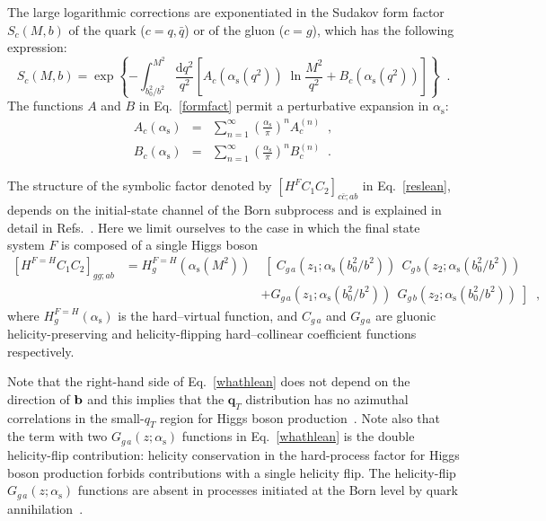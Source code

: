 \documentclass[12pt]{article}
\def\beeq{\begin{eqnarray}}
\def\eeeq{\end{eqnarray}}
\def\nn{\nonumber}
\DeclareRobustCommand{\as}{\ensuremath{\alpha_{\mathrm{s}}}}
\DeclareRobustCommand{\qt}{q_T}
\DeclareRobustCommand{\bqt}{\ensuremath{\mathbf{q}_T}}
\DeclareRobustCommand{\rd}{\ensuremath{\mathrm{d}}}
\begin{document}
The large logarithmic corrections are exponentiated in the Sudakov form factor $S_c(M,b)$ of the quark  ($c=q, {\bar q}$) or of the gluon ($c=g$), which has the following  expression:
\begin{equation}
\label{formfact}
S_c(M,b) = \exp \left\{ - \int_{b_0^2/b^2}^{M^2} \frac{\rd q^2}{q^2} 
\left[ A_c(\as(q^2)) \;\ln \frac{M^2}{q^2} + B_c(\as(q^2)) \right] \right\} 
\;\;. 
\end{equation}
The functions $A$ and $B$  in Eq.~\eqref{formfact} permit a perturbative expansion in $\as$:
\beeq
\label{aexp}
A_c(\as) &=& \sum_{n=1}^\infty \left( \frac{\as}{\pi} \right)^n A_c^{(n)} 
\;\;, \\
\label{bexp}
B_c(\as) &= &\sum_{n=1}^\infty \left( \frac{\as}{\pi} \right)^n B_c^{(n)}
\;\;.
\eeeq

The structure of the symbolic factor denoted by $\left[ H^{F} C_1 C_2 \right]_{c\bar{c};a b}$ in Eq.~\eqref{reslean}, depends on the initial-state channel of the Born subprocess and is explained in detail in Refs.~\cite{Catani:2010pd,Catani:2013tia}. Here we limit ourselves to the case in which the final state system $F$ is composed of a single Higgs boson
\beeq
\label{whathlean}
\left[ H^{F=H} C_1 C_2 \right]_{gg;ab}
&= H_{g}^{F=H}(\as(M^2)) &\;\left[ \; C_{g \,a}(z_1;\as(b_0^2/b^2)) 
\;\, C_{g \,b}(z_2;\as(b_0^2/b^2)) \right.
\nn \\
&&+ \left.  G_{g \,a}(z_1;\as(b_0^2/b^2)) 
\;\, G_{g \,b}(z_2;\as(b_0^2/b^2)) \;
\right]
\;\;,
\eeeq
where 
$H_{g}^{F=H}(\as)$ is the hard--virtual function, and $C_{g \,a}$ and $G_{g \,a}$ are 
gluonic helicity-preserving and helicity-flipping hard--collinear coefficient functions respectively.

Note that the right-hand side of Eq.~\eqref{whathlean} does not depend on the direction of $\bf b$ and this implies that the $\bqt$ distribution has no azimuthal correlations in the small-$\qt$ region for Higgs boson production~\cite{Catani:2010pd}. 
Note also that the term with two $G_{g \,a}(z;\as)$ functions in Eq.~\eqref{whathlean} is the double helicity-flip contribution: helicity conservation in the hard-process factor for Higgs boson production forbids contributions with a single helicity flip. 
The helicity-flip $G_{g \,a}(z;\as)$ functions are absent in processes initiated at the Born level by quark annihilation~\cite{Catani:2010pd}. 
\end{document}

